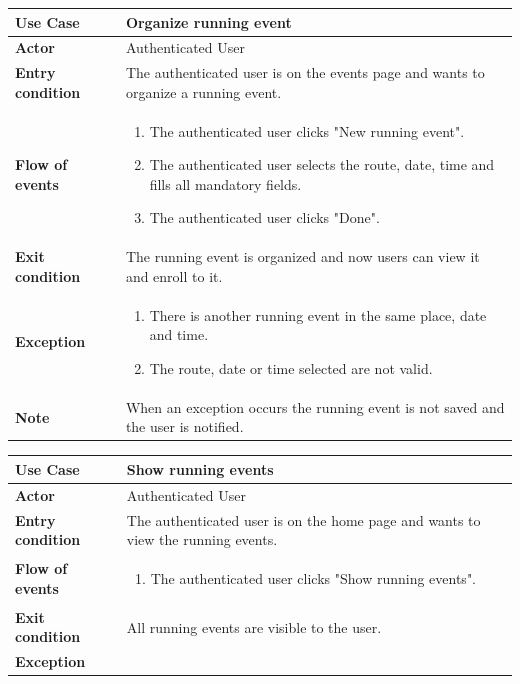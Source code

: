 \documentclass[../main.tex]{subfiles}
\begin{document}
	\begin{center}
		\begin{tabular}{p{3cm}p{8.28cm}}
			\hline
			\textbf{Use Case} & Organize running event\\
			\hline
			\textbf{Actor} & Authenticated User\\
			\hline
			\textbf{Entry condition} & The authenticated user is on the events page and wants to organize a running event.\\
			\hline
			\textbf{Flow of events} & \begin{enumerate}
				\linespread{0}\item The authenticated user clicks "New running event".
				\linespread{0}\item The authenticated user selects the route, date, time and fills all mandatory fields.
				\linespread{0}\item The authenticated user clicks "Done".
			\end{enumerate}\\
			\hline
			\textbf{Exit condition} & The running event is organized and now users can view it and enroll to it.\\
			\hline
			\textbf{Exception} & \begin{enumerate}
				\linespread{0}\item There is another running event in the same place, date and time.
				\linespread{0}\item The route, date or time selected are not valid.
			\end{enumerate}\\
			\hline
			\textbf{Note} & When an exception occurs the running event is not saved and the user is notified.\\
			\hline
		\end{tabular}
	\end{center}
	\vspace*{3cm}
	\begin{center}
		\begin{tabular}{p{3cm}p{8.28cm}}
			\hline
			\textbf{Use Case} & Show running events\\
			\hline
			\textbf{Actor} & Authenticated User\\
			\hline
			\textbf{Entry condition} & The authenticated user is on the home page and wants to view the running events.\\
			\hline
			\textbf{Flow of events} & \begin{enumerate}
				\linespread{0}\item The authenticated user clicks "Show running events".
			\end{enumerate}\\
			\hline
			\textbf{Exit condition} & All running events are visible to the user.\\
			\hline
			\textbf{Exception}\\
			\hline
		\end{tabular}
	\end{center}
\end{document}
